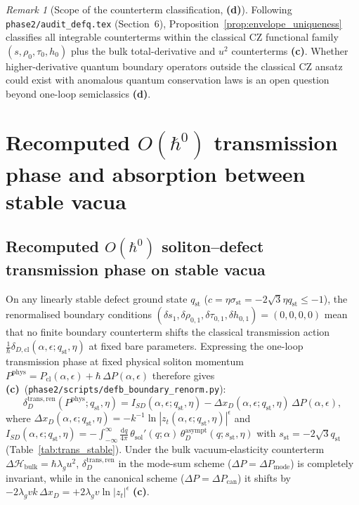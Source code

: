 \documentclass[11pt,a4paper]{article}
\theoremstyle{remark}
\newtheorem{remark}[theorem]{Remark}
\newcommand{\hb}{\hbar}
\newcommand{\dd}{\mathrm{d}}
\newcommand{\Lc}{\textbf{(c)}}
\newcommand{\Ld}{\textbf{(d)}}
\newcommand{\sren}{\texttt{phase2/\allowbreak scripts/\allowbreak defb\_\allowbreak boundary\_\allowbreak renorm.py}}
\begin{document}
\begin{remark}[Scope of the counterterm classification, \Ld]\label{rem:ct_scope}
Following \texttt{phase2/audit\_defq.tex} (Section~6), Proposition~\ref{prop:envelope_uniqueness}
classifies all integrable counterterms within the classical CZ functional
family $(s,\rho_0,\tau_0,h_0)$ plus the bulk total-derivative and $u^2$
counterterms \Lc. Whether higher-derivative quantum boundary operators outside
the classical CZ ansatz could exist with anomalous quantum conservation laws is
an open question beyond one-loop semiclassics \Ld.
\end{remark}

\section{Recomputed \texorpdfstring{$O(\hb^0)$}{O(hbar\^0)} transmission phase and absorption between stable vacua}
\label{sec:transmission_absorption}

\subsection{Recomputed \texorpdfstring{$O(\hb^0)$}{O(hbar\^0)} soliton--defect transmission phase on stable vacua}

On any linearly stable defect ground state $q_{\mathrm{st}}$
($c = \eta\sigma_{\mathrm{st}} = -2\sqrt{3}\eta q_{\mathrm{st}} \le -1$),
the renormalised boundary conditions $(\delta s_1,\delta\rho_{0,1},\delta\tau_{0,1},\delta h_{0,1}) = (0,0,0,0)$
mean that no finite boundary counterterm shifts the classical transmission
action $\frac{1}{\hb}\delta_{D,\mathrm{cl}}(\alpha,\epsilon;q_{\mathrm{st}},\eta)$
at fixed bare parameters. Expressing the one-loop transmission phase at fixed
physical soliton momentum $P^{\mathrm{phys}} = P_{\mathrm{cl}}(\alpha,\epsilon) + \hb\,\Delta P(\alpha,\epsilon)$
therefore gives \Lc\ (\sren):
\begin{equation}\label{eq:delta_trans_ren}
  \delta_D^{\mathrm{trans,ren}}(P^{\mathrm{phys}};q_{\mathrm{st}},\eta)
  = I_{SD}(\alpha,\epsilon;q_{\mathrm{st}},\eta)
    - \Delta x_D(\alpha,\epsilon;q_{\mathrm{st}},\eta)\,\Delta P(\alpha,\epsilon),
\end{equation}
where $\Delta x_D(\alpha,\epsilon;q_{\mathrm{st}},\eta) = -k^{-1}\ln|z_t(\alpha,\epsilon;q_{\mathrm{st}},\eta)|^\epsilon$
and $I_{SD}(\alpha,\epsilon;q_{\mathrm{st}},\eta) = -\int_{-\infty}^\infty \frac{\dd q}{4\pi}\,\theta_{\mathrm{sol}}'(q;\alpha)\,\theta_D^{\mathrm{asympt}}(q;s_{\mathrm{st}},\eta)$
with $s_{\mathrm{st}} = -2\sqrt{3}q_{\mathrm{st}}$ (Table~\ref{tab:trans_stable}).
Under the bulk vacuum-elasticity counterterm $\Delta\mathcal{H}_{\mathrm{bulk}} = \hb\lambda_g u^2$,
$\delta_D^{\mathrm{trans,ren}}$ in the mode-sum scheme ($\Delta P = \Delta P_{\mathrm{mode}}$)
is completely invariant, while in the canonical scheme ($\Delta P = \Delta P_{\mathrm{can}}$)
it shifts by $-2\lambda_g v k\,\Delta x_D = +2\lambda_g v\ln|z_t|^\epsilon$ \Lc.
\end{document}
